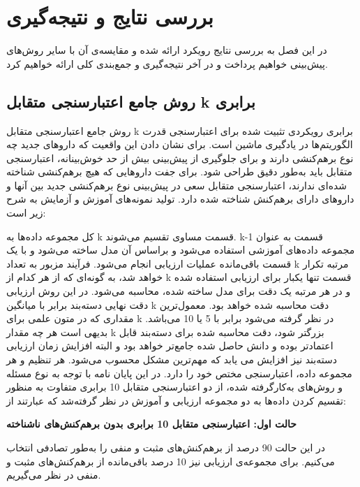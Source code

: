 \chapter{بررسی نتایج و نتیجه‌گیری‌}
در این فصل به بررسی نتایج رویکرد ارائه شده و مقایسه‌ی آن با سایر روش‌های پیش‌بینی خواهیم پرداخت و در آخر نتیجه‌گیری و جمع‌بندی کلی ارائه خواهیم کرد.
\section{ روش جامع اعتبارسنجی متقابل k برابری
\label{K-fold CV}}
 
روش جامع اعتبارسنجی متقابل k برابری
رویکردی تثبیت شده برای اعتبارسنجی قدرت الگوریتم‌ها در یادگیری ماشین است.  برای نشان دادن این واقعیت که داروهای جدید چه نوع برهم‌کنشی دارند و برای جلوگیری از پیش‌بینی بیش از حد خوش‌بینانه، اعتبارسنجی متقابل باید به‌طور دقیق طراحی شود. برای جفت داروهایی که هیچ  برهم‌کنشی شناخته شده‌ای ندارند، اعتبارسنجی متقابل سعی در پیش‌بینی نوع برهم‌کنشی جدید بین آنها و داروهای دارای برهم‌کنش شناخته شده دارد. تولید نمونه‌های آموزش و آزمایش به شرح زیر است:

کل مجموعه داده‌ها به k قسمت مساوی تقسیم می‌شوند. k-1 قسمت به عنوان مجموعه داده‌های آموزشی استفاده می‌شود و براساس آن مدل ساخته می‌شود و با یک قسمت باقی‌مانده عملیات ارزیابی انجام می‌شود. فرآیند مزبور به تعداد k مرتبه تکرار خواهد شد، به گونه‌ای که از هر کدام از k قسمت تنها یکبار برای ارزیابی استفاده شده و در هر مرتبه یک دقت
برای مدل ساخته شده، محاسبه می‌شود. در این روش ارزیابی دقت نهایی دسته‌بند
برابر با میانگین k دقت محاسبه شده خواهد بود. معمول‌ترین مقداری که در متون علمی برای k در نظر گرفته می‌شود برابر با 5 یا 10 می‌باشد. بدیهی است هر چه مقدار k بزرگتر شود، دقت محاسبه شده برای دسته‌بند قابل اعتماد‌تر بوده و دانش حاصل شده جامع‌تر خواهد بود و البته افزایش زمان ارزیابی دسته‌بند نیز افزایش می یابد که مهم‌ترین مشکل محسوب می‌شود. هر تنظیم و هر مجموعه داده، اعتبارسنجی مختص خود را دارد. در این پایان نامه با توجه به نوع مسئله و روش‌های به‌کارگرفته شده، از دو اعتبارسنجی متقابل 10 برابری متفاوت به منظور تقسیم کردن داده‌ها به دو مجموعه ارزیابی و آموزش در نظر گرفته‌شد که عبارتند از:

\textbf{حالت اول: اعتبارسنجی متقابل 10 برابری بدون برهم‌کنش‌های ناشناخته}

در این حالت 90 درصد از برهم‌کنش‌های مثبت و منفی را به‌طور تصادفی
انتخاب می‌کنیم. برای مجموعه‌ی ارزیابی نیز 10 درصد باقی‌مانده از برهم‌کنش‌های مثبت و منفی در نظر می‌گیریم. 


